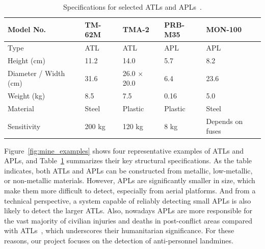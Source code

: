 \begin{table}[h]
    \centering
    \small
    \renewcommand{\arraystretch}{1.3}
    \caption{Specifications for selected ATLs and APLs~\cite{paik2002image}.}
    \label{tab:mine_specs}
    \begin{tabular}{l p{2.8cm} p{2.8cm} p{2.8cm} p{2.8cm}}
        \toprule
        \textbf{Model No.} & \textbf{TM-62M} & \textbf{TMA-2} & \textbf{PRB-M35} & \textbf{MON-100} \\
        \midrule
        Type & ATL & ATL & APL & APL \\
        Height (cm) & 11.2 & 14.0 & 5.7 & 8.2 \\
        Diameter / Width (cm) & 31.6 & 26.0 × 20.0 & 6.4 & 23.6 \\
        Weight (kg) & 8.5 & 7.5 & 0.16 & 5.0 \\
        Material & Steel & Plastic & Plastic & Steel \\
        Sensitivity & 200 kg & 120 kg & 8 kg & Depends on fuses \\
        \bottomrule
    \end{tabular}
\end{table}

Figure~\ref{fig:mine_examples} shows four representative examples of ATLs and APLs, and Table~\ref{tab:mine_specs} summarizes their key structural specifications. As the table indicates, both ATLs and APLs can be constructed from metallic, low-metallic, or non-metallic materials. However, APLs are significantly smaller in size, which make them more difficult to detect, especially from aerial platforms. And from a technical perspective, a system capable of reliably detecting small APLs is also likely to detect the larger ATLs. Also, nowadays APLs are more responsible for the vast majority of civilian injuries and deaths in post-conflict areas compared with ATLs~\cite{unmas2021handbook}, which underscores their humanitarian significance. For these reasons, our project focuses on the detection of anti-personnel landmines.
